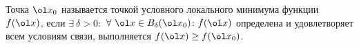 
Точка $\ol x_0$ называется точкой условного локального минимума функции $f(\ol x)$, если $\exists\ {\delta >0 \colon}$ $\forall \ \ol x\in B_\delta(\ol x_0)\colon f(\ol x)$ определена и удовлетворяет всем условиям
связи, выполняется $f(\ol x)\ge f(\ol x_0)$.
